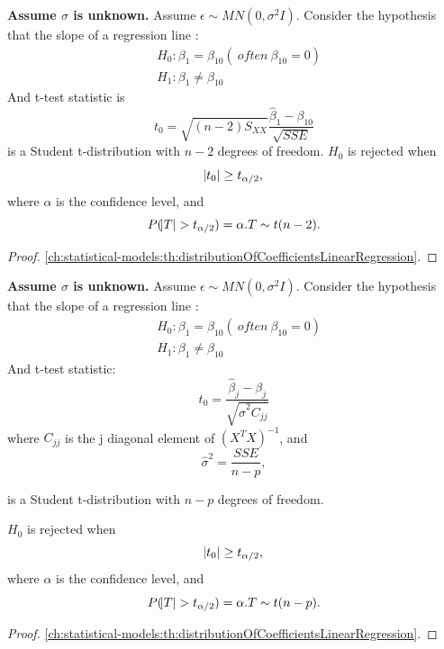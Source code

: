 \begin{refsection}
\begin{method}\cite[261]{chinese2008probability}
	\textbf{Assume $\sigma$ is unknown.}	Assume $\epsilon \sim MN(0,\sigma^2 I)$. Consider the hypothesis that the slope of a regression line :
	\begin{align*}
	&H_0: \beta_1 = \beta_{10} (~often ~ \beta_{10} = 0)\\
	&H_1: \beta_1 \neq \beta_{10}
	\end{align*}
	And t-test statistic is
	$$t_0 = \sqrt{(n-2)S_{XX}}\frac{\hat{\beta}_1 - \beta_{10}}{\sqrt{SSE}}$$
	is a Student t-distribution with $n-2$ degrees of freedom. 
		$H_0$ is rejected when $$\abs{t_0}\geq t_{\alpha/2},$$
	where $\alpha$ is the confidence level, and  $$P(\abs{T} > t_{\alpha/2}) = \alpha. T\sim t(n-2).$$
\end{method}
\begin{proof}
	\autoref{ch:statistical-models:th:distributionOfCoefficientsLinearRegression}.
\end{proof}

\begin{method}\cite[261]{chinese2008probability}
	\textbf{Assume $\sigma$ is unknown.}	Assume $\epsilon \sim MN(0,\sigma^2 I)$. Consider the hypothesis that the slope of a regression line :
	\begin{align*}
	&H_0: \beta_1 = \beta_{10} (~often ~ \beta_{10} = 0)\\
	&H_1: \beta_1 \neq \beta_{10}
	\end{align*}
	And t-test statistic:
	$$t_0 = \frac{\hat{\beta}_j - \beta_j}{\sqrt{\hat{\sigma}^2C_{jj}}} $$
	where $C_{jj}$ is the j diagonal element of $(X^TX)^{-1}$, and $$\hat{\sigma}^2 = \frac{SSE}{n-p},$$
	
	is a Student t-distribution with $n-p$ degrees of freedom. 
	
		$H_0$ is rejected when $$\abs{t_0}\geq t_{\alpha/2},$$
	where $\alpha$ is the confidence level, and  $$P(\abs{T} > t_{\alpha/2}) = \alpha. T\sim t(n-p).$$
	
\end{method}
\begin{proof}
	\autoref{ch:statistical-models:th:distributionOfCoefficientsLinearRegression}.
\end{proof}


\end{refsection}
